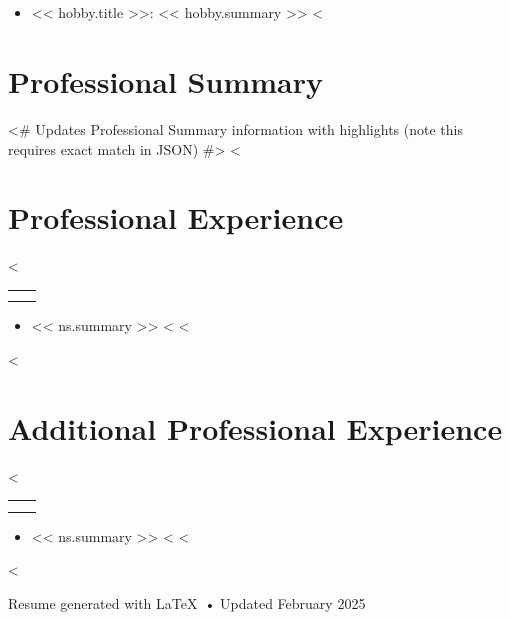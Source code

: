 \documentclass[letterpaper,11pt]{article}
\makeatletter
\newcommand{\sectionSpacing}{\vspace{5pt}}
\newcommand{\medbold}[1]{{\fontseries{100}\selectfont #1}} %
\newcommand{\leftSection}[1]{
  \section{\color{leftpaneltext}{#1}}
}
\newcommand{\listStart}{\begin{itemize}[leftmargin=0.0in, label={}]}
\newcommand{\listItem}[2]{\item{#2 {#1}}}
\newcommand{\listEnd}{\end{itemize}}
\newcommand{\genericListItem}[1]{\listItem{#1}{}}
\newcommand{\actionListStart}{\begin{itemize}[leftmargin=0.1in, label={}]}
\newcommand{\actionListItem}[1]{\listItem{#1}{\ding{43}}}
\newcommand{\resumeSubheading}[4]{
  \begin{tabular*}{\linewidth}[t]{l@{\extracolsep{\fill}}r}
    \textbf{\color{mediumgray}{#1}} & \color{mediumgray}{#2} \\
    \color{mediumgray}{#3} & \color{mediumgray}{#4} \\
  \end{tabular*}
  \vspace{-8pt}
}
\makeatother
\begin{document}
\begin{paracol}{2}
\leftSection{Interest \& Hobbies}
  \listStart
   <%
    \genericListItem{\medbold{<< hobby.title >>:} << hobby.summary >>}
   <%
  \listEnd
\switchcolumn


\titleformat{\section}{\vspace{-4pt}\raggedright\large\bfseries\color{darkgray}}{}{0em}{}[\titlerule\vspace{-5pt}]


\section{Professional Summary}
<# Updates Professional Summary information with highlights (note this requires exact match in JSON) #>
<%
\small\color{darkgray}{<< ps.summary >>}
\sectionSpacing


\section{Professional Experience}

<%
\resumeSubheading
  {<< c.company | latex_escape >>}
  {<< c.start_date >> -- << c.end_date >>}
  {<< c.title | latex_escape >>}
  {<< c.location | latex_escape >>}
  \actionListStart
  <%
    <%
      <%
      <%
      \actionListItem{<< ns.summary >>}
    <%
  <%
  \listEnd
  \sectionSpacing
<%
\sectionSpacing


\section{Additional Professional Experience}

<%
\resumeSubheading
  {<< c.company | latex_escape >>}
  {<< c.start_date >> -- << c.end_date >>}
  {<< c.title | latex_escape >>}
  {<< c.location >>}
  \actionListStart
  <%
    <%
      <%
      <%
      \actionListItem{<< ns.summary >>}
    <%
  <%
  \listEnd
  \sectionSpacing
<%
\sectionSpacing


\end{paracol}


\vfill
\begin{center}
    \scriptsize\color{lightgray}
    Resume generated with \LaTeX\ • Updated February 2025
\end{center}
\end{document}
